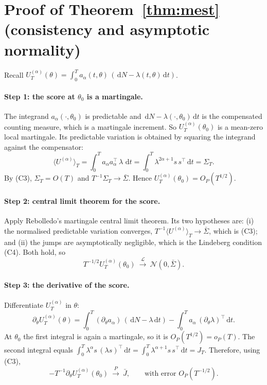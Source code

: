 \documentclass[11pt]{article}
\newcommand{\dd}{\,\mathrm{d}}
\newcommand{\toP}{\xrightarrow{P}}
\newcommand{\toL}{\xrightarrow{\mathcal{L}}}
\begin{document}
\section{Proof of Theorem~\ref{thm:mest} (consistency and asymptotic normality)}
\label{app:thm}
Recall $U_T^{(\alpha)}(\theta)=\int_0^T a_\alpha(t,\theta)\,(\dd N-\lambda(t,\theta)\dd t)$.

\paragraph{Step 1: the score at $\theta_0$ is a martingale.}
The integrand $a_\alpha(\cdot,\theta_0)$ is predictable and $\dd N-\lambda(\cdot,\theta_0)\dd t$
is the compensated counting measure, which is a martingale increment. So
$U_T^{(\alpha)}(\theta_0)$ is a mean-zero local martingale. Its predictable
variation is obtained by squaring the integrand against the compensator:
\[
\langle U^{(\alpha)}\rangle_T=\int_0^T a_\alpha a_\alpha^{\top}\,\lambda\,\dd t
=\int_0^T \lambda^{2\alpha+1}s\,s^{\top}\dd t=\Sigma_T .
\]
By (C3), $\Sigma_T=O(T)$ and $T^{-1}\Sigma_T\to\bar\Sigma$. Hence
$U_T^{(\alpha)}(\theta_0)=O_P(T^{1/2})$.

\paragraph{Step 2: central limit theorem for the score.}
Apply Rebolledo's martingale central limit theorem. Its two hypotheses are: (i)
the normalised predictable variation converges, $T^{-1}\langle U^{(\alpha)}\rangle_T\to\bar\Sigma$,
which is (C3); and (ii) the jumps are asymptotically negligible, which is the
Lindeberg condition (C4). Both hold, so
\[
T^{-1/2}U_T^{(\alpha)}(\theta_0)\ \toL\ \mathcal N(0,\bar\Sigma).
\]

\paragraph{Step 3: the derivative of the score.}
Differentiate $U_T^{(\alpha)}$ in $\theta$:
\[
\partial_\theta U_T^{(\alpha)}(\theta)=\int_0^T (\partial_\theta a_\alpha)\,(\dd N-\lambda\dd t)
-\int_0^T a_\alpha\,(\partial_\theta\lambda)^{\top}\dd t .
\]
At $\theta_0$ the first integral is again a martingale, so it is $O_P(T^{1/2})=o_P(T)$.
The second integral equals $\int_0^T \lambda^{\alpha}s\,(\lambda s)^{\top}\dd t=\int_0^T \lambda^{\alpha+1}s\,s^{\top}\dd t=J_T$.
Therefore, using (C3),
\[
-T^{-1}\partial_\theta U_T^{(\alpha)}(\theta_0)\ \toP\ \bar J,\qquad \text{with error }O_P(T^{-1/2}).
\]
\end{document}

